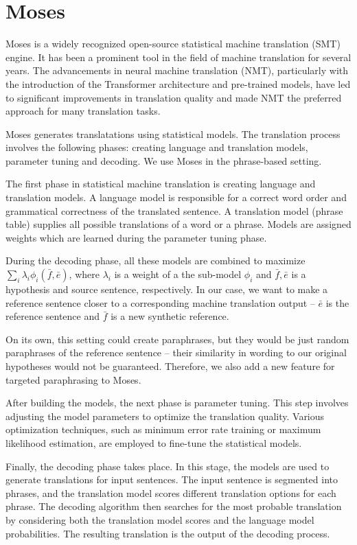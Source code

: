 \section{Moses}
Moses \citep{moses} is a widely recognized open-source statistical machine translation (SMT) engine. It has been a prominent tool in the field of machine translation for several years.
The advancements in neural machine translation (NMT), particularly with the introduction of the Transformer architecture and pre-trained models, have led to significant improvements in translation quality and made NMT the preferred approach for many translation tasks.

Moses generates translatations using statistical models. The translation process involves the following phases: creating language and translation models, parameter tuning and decoding. We use Moses in the phrase-based setting.

The first phase in statistical machine translation is creating language and translation models. 
A language model is responsible for a correct word order and grammatical correctness 
of the translated sentence. A translation model (phrase table) supplies all possible 
translations of a word or a phrase. Models are assigned weights which are learned 
during the parameter tuning phase.

During the decoding phase, all these models are combined to maximize 
$ \sum_i \lambda_i \phi_i (\bar{f},\bar{e}) $, where  $ \lambda_i $ is a weight 
of a the sub-model $ \phi_i $ and $ \bar{f},\bar{e} $ is a hypothesis and source 
sentence, respectively. In our case, we want to make a reference sentence closer
to a corresponding machine translation output -- $ \bar{e} $ is the reference 
sentence and $ \bar{f} $ is a new synthetic reference.

On its own, this setting could create paraphrases, but they would be just random
paraphrases of the reference sentence -- their similarity in wording to our original 
hypotheses would not be guaranteed. Therefore, we also add a new feature for targeted 
paraphrasing to Moses.


After building the models, the next phase is parameter tuning. This step involves adjusting the model parameters to optimize the translation quality. Various optimization techniques, such as minimum error rate training or maximum likelihood estimation, are employed to fine-tune the statistical models.

Finally, the decoding phase takes place. In this stage, the models are used to generate translations for input sentences. The input sentence is segmented into phrases, and the translation model scores different translation options for each phrase. The decoding algorithm then searches for the most probable translation by considering both the translation model scores and the language model probabilities. The resulting translation is the output of the decoding process.

